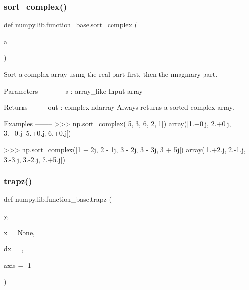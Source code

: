  \mbox{\label{namespacenumpy_1_1lib_1_1function__base_a3c45c0ca46a8e4e0474d172a415cd48e}} 
\subsubsection{\texorpdfstring{sort\+\_\+complex()}{sort\_complex()}}
{\footnotesize\ttfamily def numpy.\+lib.\+function\+\_\+base.\+sort\+\_\+complex (\begin{DoxyParamCaption}\item[{}]{a }\end{DoxyParamCaption})}

\begin{DoxyVerb}Sort a complex array using the real part first, then the imaginary part.

Parameters
----------
a : array_like
    Input array

Returns
-------
out : complex ndarray
    Always returns a sorted complex array.

Examples
--------
>>> np.sort_complex([5, 3, 6, 2, 1])
array([1.+0.j, 2.+0.j, 3.+0.j, 5.+0.j, 6.+0.j])

>>> np.sort_complex([1 + 2j, 2 - 1j, 3 - 2j, 3 - 3j, 3 + 5j])
array([1.+2.j,  2.-1.j,  3.-3.j,  3.-2.j,  3.+5.j])\end{DoxyVerb}
 \mbox{\label{namespacenumpy_1_1lib_1_1function__base_a2145040637bbaa1ee8665d5b12df916b}} 
\subsubsection{\texorpdfstring{trapz()}{trapz()}}
{\footnotesize\ttfamily def numpy.\+lib.\+function\+\_\+base.\+trapz (\begin{DoxyParamCaption}\item[{}]{y,  }\item[{}]{x = {\ttfamily None},  }\item[{}]{dx = {},  }\item[{}]{axis = {\ttfamily -\/1} }\end{DoxyParamCaption})}

